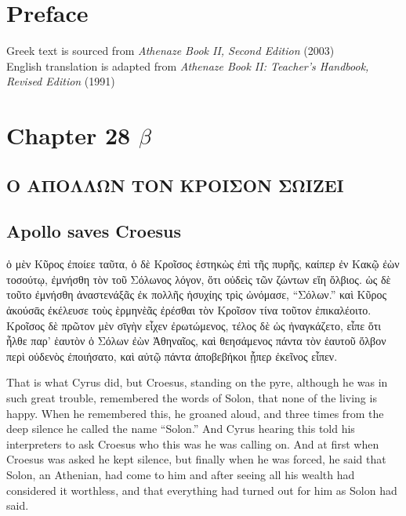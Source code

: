 \documentclass{article}
\begin{document}
\section{Preface}

Greek text is sourced from \emph{Athenaze Book II, Second Edition} (2003) \\
English translation is adapted from \emph{Athenaze Book II: Teacher's Handbook, Revised Edition} (1991)

\section{Chapter 28 $\beta$}

\subsection*{\textgreek{Ο ΑΠΟΛΛΩΝ ΤΟΝ ΚΡΟΙΣΟΝ ΣΩΙΖΕΙ}}
\subsection*{Apollo saves Croesus}

\begin{greek}
ὁ μὲν Κῦρος ἐποίεε ταῦτα, ὁ δὲ Κροῖσος ἑστηκὼς ἐπὶ τῆς πυρῆς,
καίπερ ἐν Κακῷ ἐὼν τοσούτῳ, ἐμνήσθη τὸν τοῦ Σόλωνος λόγον,
ὅτι οὐδεὶς τῶν ζώντων εἴη ὄλβιος.
ὡς δὲ τοῦτο ἐμνήσθη ἀναστενάξᾶς ἐκ πολλῆς ἡσυχίης τρὶς ὠνόμασε, “Σόλων.”
καὶ Κῦρος ἀκούσᾱς ἐκέλευσε τοὺς ὲρμηνὲᾶς ἐρέσθαι τὸν Κροῖσον τίνα τοῦτον ἐπικαλέοιτο.
Κροῖσος δὲ πρῶτον μὲν σῑγὴν εἶχεν ἐρωτώμενος, τέλος δὲ ὡς ἠναγκάζετο,
εἶπε ὅτι ἦλθε παρ’ ἑαυτὸν ὁ Σόλων ἐὼν Ἀθηναῖος,
καὶ θεησάμενος πάντα τὸν ἑαυτοῦ ὄλβον περὶ οὐδενὸς ἐποιήσατο,
καὶ αὐτῷ πάντα ἀποβεβήκοι ᾗπερ ἐκεῖνος εἶπεν. \\
\end{greek}


That is what Cyrus did, but Croesus, standing on the pyre,
although he was in such great trouble, remembered the words of Solon,
that none of the living is happy.
When he remembered this, he groaned aloud,
and three times from the deep silence he called the name ``Solon.''
And Cyrus hearing this told his interpreters to ask Croesus who this was he was calling on.
And at first when Croesus was asked he kept silence,
but finally when he was forced, he said that Solon, an Athenian, had come to him
and after seeing all his wealth had considered it worthless,
and that everything had turned out for him as Solon had said. \\
\end{document}
